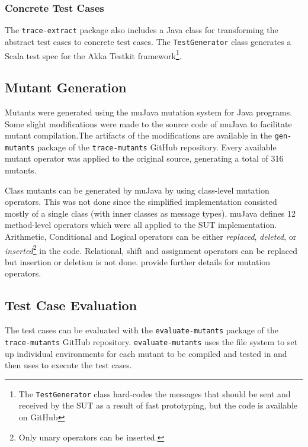 \documentclass{article}
\begin{document}
			\subsubsection{Concrete Test Cases}
				\label{sec:method_concrete}
				The \texttt{trace-extract} package also includes a Java class for transforming the abstract test cases to concrete test cases. The \texttt{TestGenerator} class generates a Scala test spec for the Akka Testkit framework\footnote{The \texttt{TestGenerator} class hard-codes the messages that should be sent and received by the SUT as a result of fast prototyping, but the code is available on GitHub}.

		\subsection{Mutant Generation}
			\label{sec:method_mutgen}
			Mutants were generated using the muJava \citet{mujava} mutation system for Java programs. Some slight modifications were made to the source code of muJava to facilitate mutant compilation.The artifacts of the modifications are available in the \texttt{gen-mutants} package of the \texttt{trace-mutants} GitHub repository. Every available mutant operator was applied to the original source, generating a total of 316 mutants.

			Class mutants can be generated by muJava by using class-level mutation operators. This was not done since the simplified implementation consisted mostly of a single class (with inner classes as message types). muJava defines 12 method-level operators which were all applied to the SUT implementation. Arithmetic, Conditional and Logical operators can be either \textit{replaced}, \textit{deleted}, or \textit{inserted}\footnote{Only unary operators can be inserted.} in the code. Relational, shift and assignment operators can be replaced but insertion or deletion is not done. \citet{mutopsMethod} provide further details for mutation operators.

		\subsection{Test Case Evaluation}
			\label{sec:method_testing}
			The test cases can be evaluated with the \texttt{evaluate-mutants} package of the \texttt{trace-mutants} GitHub repository. \texttt{evaluate-mutants} uses the file system to set up individual environments for each mutant to be compiled and tested in and then uses \citeauthor{sbt} to execute the test cases.
\end{document}
